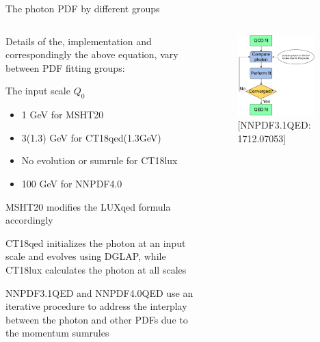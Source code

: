 \documentclass[aspectratio=169, 8pt,t]{beamer}
\begin{document}
\begin{frame}{The photon PDF by different groups}
  \begin{columns}
    \begin{column}{0.59\textwidth}
      Details of the, implementation and correspondingly the above equation, vary between PDF fitting groups:

      \vspace*{1em}
      The input scale $Q_0$
      \begin{itemize}
        \item 1 GeV for MSHT20
        \item 3(1.3) GeV for CT18qed(1.3GeV)
        \item No evolution or sumrule for CT18lux
        \item 100 GeV for NNPDF4.0
      \end{itemize}

      \vspace*{1em}
      MSHT20 modifies the LUXqed formula accordingly

      \vspace*{1em}
      CT18qed initializes the photon at an input scale and evolves using DGLAP, while CT18lux calculates the photon at all scales

      \vspace*{1em}
      NNPDF3.1QED and NNPDF4.0QED use an iterative procedure to address the interplay between the photon and other PDFs due to the momentum sumrules
    \end{column}

    \begin{column}{0.39\textwidth}
      \vspace*{-1.5em}
      \begin{figure}
        \includegraphics[width=0.9\textwidth]{figures/luxqed_iteration.pdf}
        \caption*{\color{gray} [NNPDF3.1QED: 1712.07053]}
      \end{figure}
    \end{column}
  \end{columns}


\end{frame}
\end{document}
